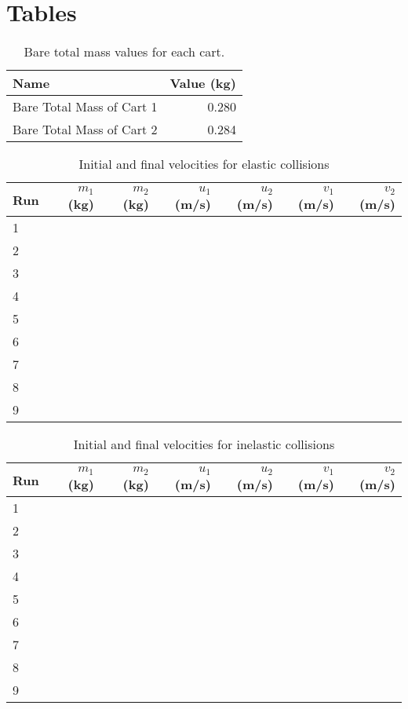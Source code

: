 \section{Tables}
%
\begin{table}[ht]
    \centering
    \begin{tabular}{|l|r|}
        \hline
        Name & Value (kg) \\
        \hline
        Bare Total Mass of Cart 1 & 0.280 \\
        Bare Total Mass of Cart 2 & 0.284 \\
        \hline
    \end{tabular}
    \caption{Bare total mass values for each cart.}
    \label{09:table.mass}
\end{table}
%
\begin{table}[ht]
    \centering
    \begin{tabular}{|l|r|r|r|r|r|r|}
        \hline
        Run & $m_{1}$ (kg) & $m_{2}$ (kg) & $u_{1}$ (m/s) & $u_{2}$ (m/s) & $v_{1}$ (m/s) & $v_{2}$ (m/s) \\
        \hline
        1 & & & & & & \\
        2 & & & & & & \\
        3 & & & & & & \\
        \hline
        4 & & & & & & \\
        5 & & & & & & \\
        6 & & & & & & \\
        \hline
        7 & & & & & & \\
        8 & & & & & & \\
        9 & & & & & & \\
        \hline
    \end{tabular}
    \caption{Initial and final velocities for elastic collisions}
    \label{09:table.v.elastic}
\end{table}
%
\begin{table}[ht]
    \centering
    \begin{tabular}{|l|r|r|r|r|r|r|}
        \hline
        Run & $m_{1}$ (kg) & $m_{2}$ (kg) & $u_{1}$ (m/s) & $u_{2}$ (m/s) & $v_{1}$ (m/s) & $v_{2}$ (m/s) \\
        \hline
        1 & & & & & & \\
        2 & & & & & & \\
        3 & & & & & & \\
        \hline
        4 & & & & & & \\
        5 & & & & & & \\
        6 & & & & & & \\
        \hline
        7 & & & & & & \\
        8 & & & & & & \\
        9 & & & & & & \\
        \hline
    \end{tabular}
    \caption{Initial and final velocities for inelastic collisions}
    \label{09:table.v.inelastic}
\end{table}
